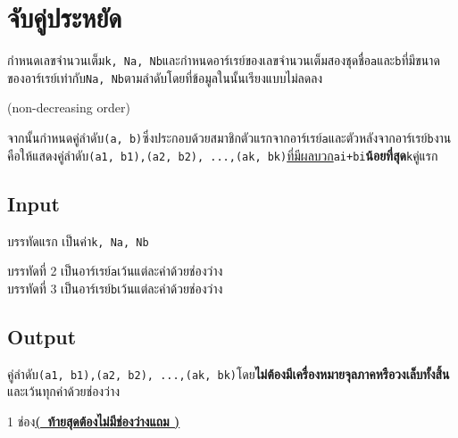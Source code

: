 \documentclass{article}
\begin{document}
\section*{จับคู่ประหยัด}

กำหนดเลขจำนวนเต็ม\texttt{k,\ Na,\ Nb}และกำหนดอาร์เรย์ของเลขจำนวนเต็มสองชุดชื่อ\texttt{a}และ\texttt{b}ที่มีขนาดของอาร์เรย์เท่ากับ\texttt{Na,\ Nb}ตามลำดับโดยที่ข้อมูลในนั้นเรียงแบบไม่ลดลง

(non-decreasing order)

จากนั้นกำหนดคู่ลำดับ\texttt{(a,\ b)}ซึ่งประกอบด้วยสมาชิกตัวแรกจากอาร์เรย์\texttt{a}และตัวหลังจากอาร์เรย์\texttt{b}งานคือให้แสดงคู่ลำดับ\texttt{(a1,\ b1),(a2,\ b2),\ ...,(ak,\ bk)}\ul{ที่มีผลบวก}\texttt{ai+bi}{\textbf{น้อยที่สุด}}\texttt{k}คู่แรก\\



\subsection*{Input}
บรรทัดแรก เป็นค่า\texttt{k,\ Na,\ Nb}



บรรทัดที่ 2 เป็นอาร์เรย์\texttt{a}เว้นแต่ละค่าด้วยช่องว่าง\\



บรรทัดที่ 3 เป็นอาร์เรย์\texttt{b}เว้นแต่ละค่าด้วยช่องว่าง\\



\subsection*{Output}
คู่ลำดับ\texttt{(a1,\ b1),(a2,\ b2),\ ...,(ak,\ bk)}โดย\textbf{ไม่ต้องมีเครื่องหมายจุลภาคหรือวงเล็บทั้งสิ้น}และเว้นทุกค่าด้วยช่องว่าง

1 ช่อง\ul{\textbf{(~ท้ายสุดต้องไม่มีช่องว่างแถม )}}\\
\end{document}
